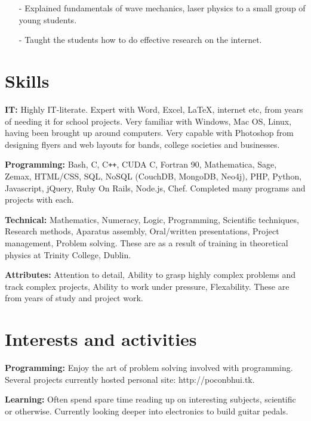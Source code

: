 \documentclass{res}
\newcommand{\fakeitem}{\hangindent=10pt\hangafter 1}
\begin{document}
\begin{resume}
\begin{itemize}
\item[-] Explained fundamentals of wave mechanics, laser physics to a small group of young students.

\item[-] Taught the students how to do effective research on the internet.
\end{itemize}




\clearpage



\section{Skills}

\fakeitem
{\bf IT:} Highly IT-literate. Expert with Word, Excel, LaTeX, internet etc, from years of needing it for school projects. Very familiar with Windows, Mac OS, Linux, having been brought up around computers. Very capable with Photoshop from designing flyers and web layouts for bands, college societies and businesses.

\fakeitem
{\bf Programming:} Bash, C, C\verb!++!, CUDA C, Fortran 90, Mathematica, Sage, Zemax, HTML/CSS, SQL, NoSQL (CouchDB, MongoDB, Neo4j), PHP, Python, Javascript, jQuery, Ruby On Rails, Node.js, Chef. Completed many programs and projects with each.

\fakeitem
{\bf Technical:} Mathematics, Numeracy, Logic, Programming, Scientific techniques, Research methods, Aparatus assembly, Oral/written presentations, Project management, Problem solving. These are as a result of training in theoretical physics at Trinity College, Dublin.

\fakeitem
{\bf Attributes:} Attention to detail, Ability to grasp highly complex problems and track complex projects, Ability to work under pressure, Flexability. These are from years of study and project work.



\section{Interests and activities}

\fakeitem
{\bf Programming:} Enjoy the art of problem solving involved with programming. Several projects currently hosted personal site: http://poconbhui.tk.

\fakeitem
{\bf Learning:} Often spend spare time reading up on interesting subjects, scientific or otherwise. Currently looking deeper into electronics to build guitar pedals.


\end{resume}
\end{document}
